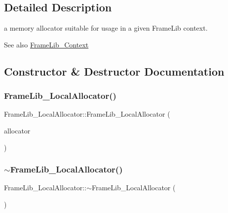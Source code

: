 \subsection{Detailed Description}
a memory allocator suitable for usage in a given Frame\+Lib context. 

\begin{DoxySeeAlso}{See also}
\hyperlink{class_frame_lib___context}{Frame\+Lib\+\_\+\+Context} 
\end{DoxySeeAlso}


\subsection{Constructor \& Destructor Documentation}
\mbox{\label{class_frame_lib___local_allocator_a218131bb74240289b83dc7cd0e0ad6a7}} 
\subsubsection{\texorpdfstring{Frame\+Lib\+\_\+\+Local\+Allocator()}{FrameLib\_LocalAllocator()}\hspace{0.1cm}{\footnotesize\ttfamily [1/2]}}
{\footnotesize\ttfamily Frame\+Lib\+\_\+\+Local\+Allocator\+::\+Frame\+Lib\+\_\+\+Local\+Allocator (\begin{DoxyParamCaption}\item[{\hyperlink{class_frame_lib___global_allocator}{Frame\+Lib\+\_\+\+Global\+Allocator} $\ast$}]{allocator }\end{DoxyParamCaption})}

\mbox{\label{class_frame_lib___local_allocator_a7c7bc361ea0fc016fdc7da6282c963d4}} 
\subsubsection{\texorpdfstring{$\sim$\+Frame\+Lib\+\_\+\+Local\+Allocator()}{~FrameLib\_LocalAllocator()}}
{\footnotesize\ttfamily Frame\+Lib\+\_\+\+Local\+Allocator\+::$\sim$\+Frame\+Lib\+\_\+\+Local\+Allocator (\begin{DoxyParamCaption}{ }\end{DoxyParamCaption})}

